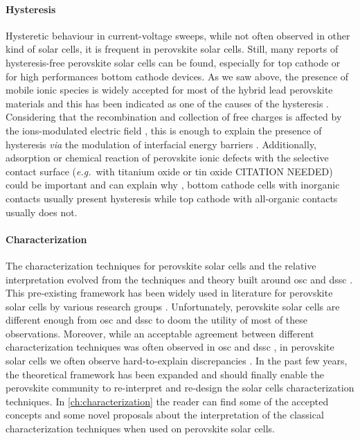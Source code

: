 	\paragraph{Hysteresis}
	Hysteretic behaviour in current-voltage sweeps, while not often observed in other kind of solar cells, it is frequent in perovskite solar cells.
	Still, many reports of hysteresis-free perovskite solar cells can be found, especially for top cathode or for high performances bottom cathode devices.
	As we saw above, the presence of mobile ionic species is widely accepted for most of the hybrid lead perovskite materials and this has been indicated as one of the causes of the hysteresis \cite{Unger2014,Xiao2015}.
	Considering that the recombination and collection of free charges is affected by the ions-modulated electric field \cite{Pockett2017}, this is enough to explain the presence of hysteresis \cite{Tress2015,Calado2016} \textsl{via} the modulation of interfacial energy barriers \cite{Moia2019}.
	Additionally, adsorption or chemical reaction of perovskite ionic defects with the selective contact surface (\textsl{e.g.}\ with titanium oxide \cite{Yu2016,Beilsten-Edmands2015,Carrillo2016} or tin oxide CITATION NEEDED) could be important and can explain why \cite{Moia2019}, bottom cathode cells with inorganic contacts usually present hysteresis while top cathode with all-organic contacts usually does not.



	\paragraph{Characterization}
	The characterization techniques for perovskite solar cells and the relative interpretation evolved from the techniques and theory built around \gls{osc} and \gls{dssc} \cite{Barnes2013}.
	This pre-existing framework has been widely used in literature for perovskite solar cells by various research groups \cite{ORegan2015b,Shao2016,Gelmetti2019,Kiermasch2018,Carnie2015}.
	Unfortunately, perovskite solar cells are different enough from \gls{osc} and \gls{dssc} to doom the utility of most of these observations.
	Moreover, while an acceptable agreement between different characterization techniques was often observed in \gls{osc} \cite{Clarke2015,Maurano2011,Foertig2012} and \gls{dssc} \cite{Barnes2013}, in perovskite solar cells we often observe hard-to-explain discrepancies \cite{Kiermasch2018}.
	In the past few years, the theoretical framework has been expanded and should finally enable the perovskite community to re-interpret and re-design the solar cells characterization techniques.
	In \cref{ch:characterization} the reader can find some of the accepted concepts and some novel proposals about the interpretation of the classical characterization techniques when used on perovskite solar cells.

